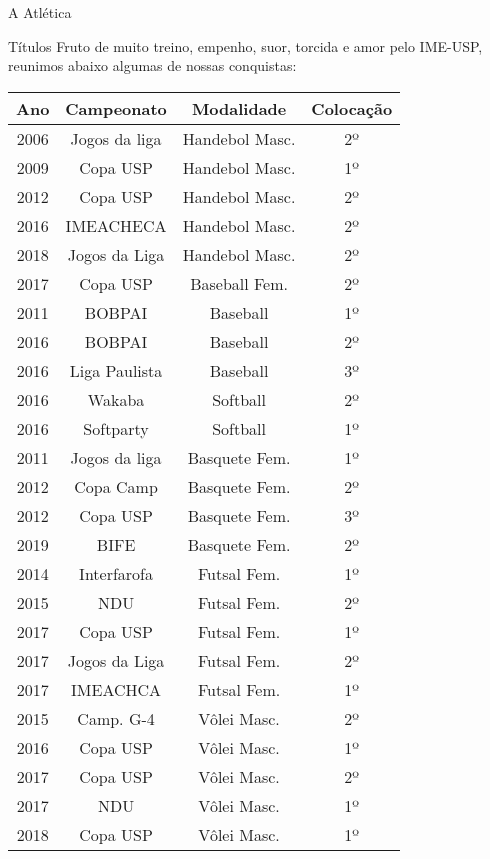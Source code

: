\begin{secao}{A Atlética}
\begin{subsecao}{Títulos}
Fruto de muito treino, empenho, suor, torcida e amor pelo IME-USP, reunimos
abaixo algumas de nossas conquistas:

\begin{center}
  \begin{tabular}{c|c|c|c}
    Ano & Campeonato & Modalidade & Colocação\\
    \hline
    2006 & Jogos da liga  & Handebol Masc.  & 2º\\
    2009 & Copa USP       & Handebol Masc.  & 1º\\
    2012 & Copa USP       & Handebol Masc.  & 2º\\
    2016 & IMEACHECA      & Handebol Masc.  & 2º\\
    2018 & Jogos da Liga  & Handebol Masc.  & 2º\\
    2017 & Copa USP       & Baseball Fem.   & 2º\\
    2011 & BOBPAI         & Baseball        & 1º\\
    2016 & BOBPAI         & Baseball        & 2º\\
    2016 & Liga Paulista  & Baseball        & 3º\\
    2016 & Wakaba         & Softball        & 2º\\
    2016 & Softparty      & Softball        & 1º\\
    2011 & Jogos da liga  & Basquete Fem.   & 1º\\
    2012 & Copa Camp      & Basquete Fem.   & 2º\\
    2012 & Copa USP       & Basquete Fem.   & 3º\\
    2019 & BIFE           & Basquete Fem.   & 2º\\
    2014 & Interfarofa    & Futsal Fem.     & 1º\\
    2015 & NDU            & Futsal Fem.     & 2º\\
    2017 & Copa USP       & Futsal Fem.     & 1º\\
    2017 & Jogos da Liga  & Futsal Fem.     & 2º\\
    2017 & IMEACHCA       & Futsal Fem.     & 1º\\
    2015 & Camp. G-4      & Vôlei Masc.     & 2º\\
    2016 & Copa USP       & Vôlei Masc.     & 1º\\
    2017 & Copa USP       & Vôlei Masc.     & 2º\\
    2017 & NDU            & Vôlei Masc.     & 1º\\
    2018 & Copa USP       & Vôlei Masc.     & 1º\\

\end{tabular}
\end{center}
\end{subsecao}
\end{secao}

